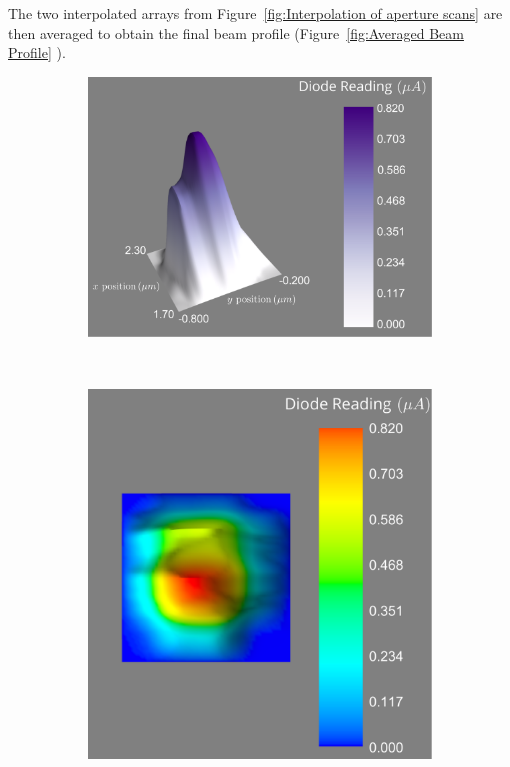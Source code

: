 The two interpolated arrays from Figure~\ref{fig:Interpolation of aperture scans} are then averaged to obtain the final beam profile (Figure~\ref{fig:Averaged Beam Profile} ).
\begin{figure}
    \centering
    \begin{subfigure}[b]{0.8\textwidth}
            \centering
            \includegraphics[width=\textwidth]{figures/beam/averaged_beam.pdf}
            \caption{}
            \label{fig:Full averaged interpolated beam}
    \end{subfigure}
    \\
    \begin{subfigure}[b]{0.75\textwidth}
            \centering
            \includegraphics[width=\textwidth]{figures/beam/Overhead_beam.pdf}

\end{subfigure}
\end{figure}
